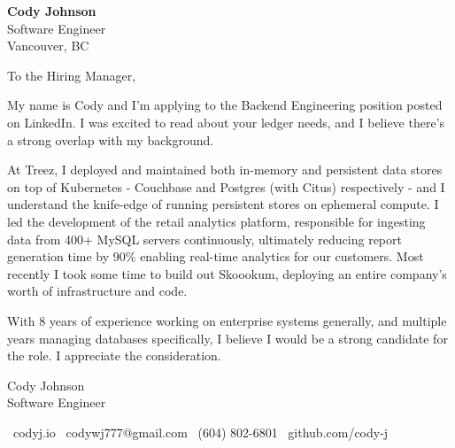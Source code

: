 \documentclass[11pt,a4paper]{article}
\begin{document}
\begin{minipage}{0.7\textwidth}
    {\huge \textbf{Cody Johnson}}\\[0.5em]
    {\Large Software Engineer}\\[0.3em]
    {Vancouver, BC}
\end{minipage}%
\vspace{1em}
\vspace{5em}


\begin{adjustwidth}{}{}
    To the Hiring Manager,

    \vspace{2em}

    My name is Cody and I'm applying to the Backend Engineering position posted on LinkedIn. I was excited to read about your ledger needs, and I believe there's a strong overlap with my background.

    \vspace{1em}

    At Treez, I deployed and maintained both in-memory and persistent data stores on top of Kubernetes - Couchbase and Postgres (with Citus) respectively - and I understand the knife-edge of running persistent stores on ephemeral compute. I led the development of the retail analytics platform, responsible for ingesting data from 400+ MySQL servers continuously, ultimately reducing report generation time by 90\% enabling real-time analytics for our customers. Most recently I took some time to build out Skoookum, deploying an entire company's worth of infrastructure and code.

    \vspace{1em}

    With 8 years of experience working on enterprise systems generally, and multiple years managing databases specifically, I believe I would be a strong candidate for the role. I appreciate the consideration.
\end{adjustwidth}

\vspace{4em}

Cody Johnson\\
\vspace{0.3em}
\scriptsize{Software Engineer}


\vfill

\begin{center}
    \faGlobe\ codyj.io%
    \hspace{1em}\textbar\hspace{1em}%
    \faEnvelope\ codywj777@gmail.com%
    \hspace{1em}\textbar\hspace{1em}%
    \faPhone\ (604) 802-6801%
    \hspace{1em}\textbar\hspace{1em}%
    \faGithub\ github.com/cody-j%
\end{center}
\end{document}
